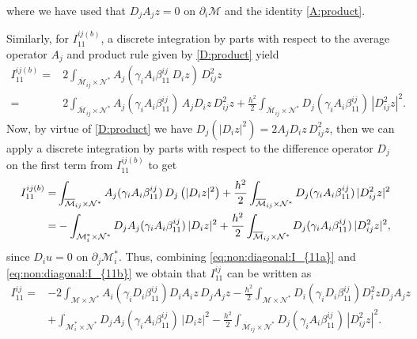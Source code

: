 \documentclass[11pt,oneside,leqno]{amsart}
\numberwithin{equation}{section}
\numberwithin{equation}{section}
\begin{document}
where we have used that $D_{j}A_{j}z=0$ on $\partial_{i}\mathcal{M}$ and the identity \eqref{A:product}.
\par Similarly, for $I_{11}^{ij(b)}$, a discrete integration by parts with respect to the average operator $A_{j}$ and product rule given by \eqref{D:product} yield
\begin{equation*}
\begin{split}
    I_{11}^{ij(b)}=&2\int_{\overline{\mathcal{M}}_{ij}\times\mathcal{N}^{\ast}}A_{j}(\gamma_{i}A_{i}\beta_{11}^{ij}\,D_{i}z)\,D_{ij}^{2}z\\
    =&2\int_{\overline{\mathcal{M}}_{ij}\times\mathcal{N}^{\ast}}A_{j}(\gamma_{i}A_{i}\beta_{11}^{ij})\,A_{j}D_{i}z\,D_{ij}^{2}z+\frac{h^{2}}{2}\int_{\overline{\mathcal{M}}_{ij}\times\mathcal{N}^{\ast}}D_{j}(\gamma_{i}A_{i}\beta_{11}^{ij})\,|D_{ij}^{2}z|^{2}.
    \end{split}
\end{equation*}
Now, by virtue of \eqref{D:product} we have $D_{j}\left( |D_{i}z|^{2}\right)=2A_{j}D_{i}z\,D_{ij}^{2}z$, then we can apply a discrete integration by parts with respect to the difference operator $D_{j}$ on the first term from $I_{11}^{ij(b)}$ to get
\begin{equation}\label{eq:non:diagonal:I_{11b}}
\begin{split}
I_{11}^{ij(b)}=&\int_{\overline{\mathcal{M}}_{ij}\times\mathcal{N}^{\ast}}A_{j}(\gamma_{i}A_{i}\beta_{11}^{ij})\,D_{j}\left( |D_{i}z|^{2}\right)+\frac{h^{2}}{2}\int_{\overline{\mathcal{M}}_{ij}\times\mathcal{N}^{\ast}}D_{j}(\gamma_{i}A_{i}\beta_{11}^{ij})\,|D_{ij}^{2}z|^{2}\\
=&-\int_{\mathcal{M}^{\ast}_{i}\times\mathcal{N}^{\ast}}D_{j}A_{j}(\gamma_{i}A_{i}\beta_{11}^{ij})\, |D_{i}z|^{2}+\frac{h^{2}}{2}\int_{\overline{\mathcal{M}}_{ij}\times\mathcal{N}^{\ast}}D_{j}(\gamma_{i}A_{i}\beta_{11}^{ij})\,|D_{ij}^{2}z|^{2},
    \end{split}
\end{equation}
since $D_{i}u=0$ on $\partial_{j}\mathcal{M}^{\ast}_{i}$. Thus, combining \eqref{eq:non:diagonal:I_{11a}} and \eqref{eq:non:diagonal:I_{11b}} we obtain that $I_{11}^{ij}$ can be written as
\begin{equation}
    \begin{split}
       I_{11}^{ij}=&-2\int_{\mathcal{M}\times\mathcal{N}^{\ast}}A_{i}(\gamma_{i}D_{i} \beta_{11}^{ij})D_{i}A_{i}z\,D_{j}A_{j}z-\frac{h^{2}}{2}\int_{\mathcal{M}\times\mathcal{N}^{\ast}}D_{i}(\gamma_{i}D_{i}\beta_{11}^{ij})D_{i}^{2}zD_{j}A_{j}z\\
      &+\int_{\mathcal{M}^{\ast}_{i}\times\mathcal{N}^{\ast}}D_{j}A_{j}(\gamma_{i}A_{i}\beta_{11}^{ij})\, |D_{i}z|^{2}-\frac{h^{2}}{2}\int_{\overline{\mathcal{M}}_{ij}\times\mathcal{N}^{\ast}}D_{j}(\gamma_{i}A_{i}\beta_{11}^{ij})\,|D_{ij}^{2}z|^{2}.
    \end{split}
\end{equation}
\end{document}
